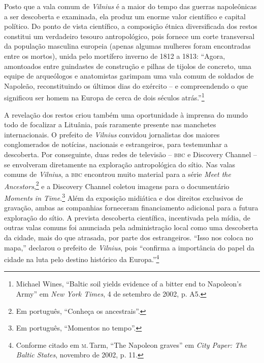 Posto que a vala comum de \textit{Vilnius} é a maior do tempo das guerras
napoleônicas a ser descoberta e examinada, ela produz um enorme valor
científico e capital político. Do ponto de vista científico, a
composição étnica diversificada dos restos constitui um verdadeiro
tesouro antropológico, pois fornece um corte transversal da população
masculina europeia (apenas algumas mulheres foram encontradas entre os
mortos), unida pelo mortífero inverno de 1812 a 1813: ``Agora, amontoados
entre guindastes de construção e pilhas de tijolos de concreto, uma
equipe de arqueólogos e anatomistas garimpam uma vala comum de soldados
de Napoleão, reconstituindo os últimos dias do exército -- e
compreendendo o que significou ser homem na Europa de cerca de dois
séculos atrás.''\footnote{Michael Wines, ``Baltic soil yields evidence of a bitter end to Napoleon's Army'' em \textit{New York Times}, 4 de setembro de 2002, p. A5.}

A revelação dos restos criou também uma oportunidade à imprensa do mundo
todo de focalizar a Lituânia, país raramente presente nas manchetes
internacionais. O prefeito de \textit{Vilnius} convidou jornalistas dos maiores
conglomerados de notícias, nacionais e estrangeiros, para testemunhar a
descoberta. Por conseguinte, duas redes de televisão -- \textsc{bbc} e Discovery
Channel -- se envolveram diretamente na exploração antropológica do
sítio. Nas valas comuns de \textit{Vilnius}, a \textsc{bbc} encontrou muito material para
a série \textit{Meet the Ancestors},\footnote{Em português, ``Conheça os ancestrais''.} e a Discovery Channel coletou imagens
para o documentário \textit{Moments in Time}.\footnote{Em português, ``Momentos no tempo''.} Além da exposição midiática e
dos direitos exclusivos de gravação, ambas as companhias forneceram
financiamento adicional para a futura exploração do sítio. A prevista
descoberta científica, incentivada pela mídia, de outras valas comuns
foi anunciada pela administração local como uma descoberta da cidade,
mais do que atrasada, por parte dos estrangeiros. ``Isso nos coloca no
mapa,'' declarou o prefeito de \textit{Vilnius}, pois ``confirma a importância do
papel da cidade na luta pelo destino histórico da Europa.''\footnote{Conforme citado em \textsc{m}.\,Tarm, ``The Napoleon graves'' em \textit{City Paper: The Baltic States}, novembro de 2002, p. 11.}

